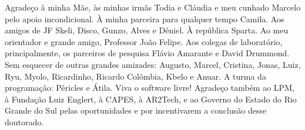 \documentclass[
    oneside, %
	12pt,				%
	a4paper,			%
	chapter=TITLE,		%
	english,			%
	french,				%
	spanish,			%
	brazil				%
	]{abntex2}
\begin{document}
\frenchspacing 


\imprimircapa

\imprimirfolhaderosto*


%
%     


%
% 
%

\begin{agradecimentos}

Agradeço à minha Mãe, às minhas irmãs Todia e Cláudia e meu cunhado Marcelo pelo apoio incondicional. À minha parceira para qualquer tempo Camila. Aos amigos de JF Skeli, Disco, Gunzo, Alves e Dêniel. À república Sparta. Ao meu orientador e grande amigo, Professor João Felipe. Aos colegas de laboratório, principalmente, os parceiros de pesquisa Flávio Amarante e David Drummond. Sem esquecer de outras grandes amizades: Augusto, Marcel, Cristina, Jonas, Luiz, Ryu, Myolo, Ricardinho, Ricardo Colômbia, Kbelo e Anuar. A turma  da programação: Péricles e Átila. Viva o software livre! Agradeço também ao LPM, à Fundação Luiz Englert, à CAPES, à AR2Tech, e ao Governo do Estado do Rio Grande do Sul pelas oportunidades e por incentivarem a conclusão desse doutorado.

\end{agradecimentos}
\end{document}

